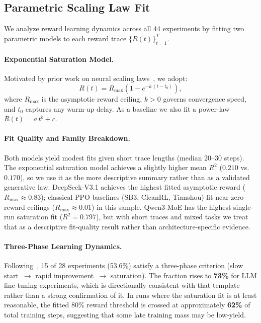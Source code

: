 \documentclass{article}
\begin{document}
\subsection{Parametric Scaling Law Fit}
\label{sec:scaling_laws}

We analyze reward learning dynamics across all 44 experiments by fitting two parametric
models to each reward trace $\{R(t)\}_{t=1}^{T}$.

\paragraph{Exponential Saturation Model.}
Motivated by prior work on neural scaling laws~\cite{nimmaturi2025scalinglaws}, we adopt:
\begin{equation}
  \label{eq:exp_sat}
  R(t) = R_{\max}\!\left(1 - e^{-k\,(t - t_0)}\right),
\end{equation}
where $R_{\max}$ is the asymptotic reward ceiling, $k > 0$ governs convergence speed,
and $t_0$ captures any warm-up delay.
As a baseline we also fit a power-law $R(t) = a\,t^{b} + c$.

\paragraph{Fit Quality and Family Breakdown.}
Both models yield modest fits given short trace lengths (median 20--30 steps).
The exponential saturation model achieves a slightly higher mean $R^{2}$
($0.210$ vs.\ $0.170$), so we use it as the more descriptive summary rather
than as a validated generative law. DeepSeek-V3.1 achieves the highest fitted
asymptotic reward ($R_{\max} \approx 0.83$); classical PPO baselines (SB3,
CleanRL, Tianshou) fit near-zero reward ceilings ($R_{\max} \approx 0.01$) in
this sample. Qwen3-MoE has the highest single-run saturation fit
($R^{2} = 0.797$), but with short traces and mixed tasks we treat that as a
descriptive fit-quality result rather than architecture-specific evidence.

\paragraph{Three-Phase Learning Dynamics.}
Following~\citet{nimmaturi2025scalinglaws}, 15 of 28 experiments (53.6\%)
satisfy a three-phase criterion (slow start~$\to$ rapid improvement~$\to$
saturation). The fraction rises to \textbf{73\%} for LLM fine-tuning
experiments, which is directionally consistent with that template rather than
a strong confirmation of it. In runs where the saturation fit is at least
reasonable, the fitted 80\% reward threshold is crossed at approximately
\textbf{62\%} of total training steps, suggesting that some late training mass
may be low-yield.
\end{document}
